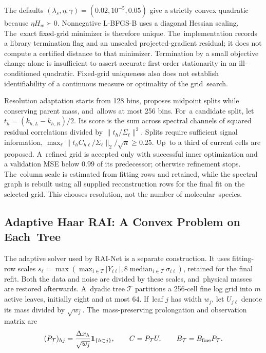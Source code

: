 \documentclass[mathematics,article,accept,moreauthors]{Definitions/mdpi}
\newcommand{\one}{\mathbf{1}}
\begin{document}
The defaults $(\lambda_s,\eta,\gamma)=(0.02,10^{-5},0.05)$ give a strictly convex quadratic because $\eta H_w\succ0$. Nonnegative L-BFGS-B uses a diagonal Hessian scaling. The~exact fixed-grid minimizer is therefore unique. The~implementation records a library termination flag and an unscaled projected-gradient residual; it does not compute a certified distance to that minimizer. Termination by a small objective change alone is insufficient to assert accurate first-order stationarity in an ill-conditioned quadratic. Fixed-grid uniqueness also does not establish identifiability of a continuous measure or optimality of the grid~search.

Resolution adaptation starts from 128 bins, proposes midpoint splits while conserving parent mass, and~allows at most 256 bins. For~a candidate split, let $t_h=(k_{h,L}-k_{h,R})/2$. Its score is the sum across spectral channels of squared residual correlations divided by $\|t_h/\Sigma_\ell\|^2$. Splits require sufficient signal information, $\max_\ell\|t_h C_{h\ell}/\Sigma_\ell\|_2/\sqrt n\geq0.25$. Up~to a third of current cells are proposed. A~refined grid is accepted only with successful inner optimization and a validation MSE below $0.99$ of its predecessor; otherwise refinement stops. The~column scale is estimated from fitting rows and retained, while the spectral graph is rebuilt using all supplied reconstruction rows for the final fit on the selected grid. This chooses resolution, not the number of molecular~species.

\subsection{Adaptive Haar RAI: A Convex Problem on Each~Tree}\label{sec:raiadaptive}
The adaptive solver used by RAI-Net is a separate construction. It uses fitting-row scales $s_\ell=\max(\max_{i\in T}|Y_{i\ell}|,8\operatorname{median}_{i\in T}\sigma_{i\ell})$, retained for the final refit. Both the data and noise are divided by these scales, and~physical masses are restored afterwards. A~dyadic tree $\mathcal T$ partitions a 256-cell fine log grid into $m$ active leaves, initially eight and at most 64. If~leaf $j$ has width $w_j$, let $U_{j\ell}$ denote its mass divided by $\sqrt{w_j}$. The~mass-preserving prolongation and observation matrix are
\begin{equation}\label{eq:raiprojection}
 (P_{\mathcal T})_{hj}=\frac{\Delta x_h}{\sqrt{w_j}}\one_{\{h\subset j\}},
 \qquad C=P_{\mathcal T}U,\qquad B_{\mathcal T}=B_{\rm fine}P_{\mathcal T}.
\end{equation}
\end{document}
